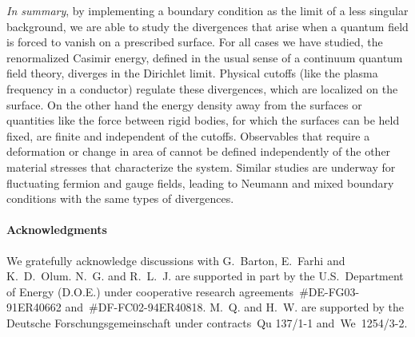 \documentclass[a4paper,aps,amsfonts,prl,showpacs,nobibnotes,nofootinbib,%
tightenlines,twocolumn]{revtex4}
\begin{document}
\emph{In summary}, by implementing a boundary condition as the limit
of a less singular background, we are able to study the divergences
that arise when a quantum field is forced to vanish on a prescribed
surface.  For all cases we have studied, the renormalized
Casimir energy, defined in the usual sense of a continuum quantum
field theory, diverges in the Dirichlet limit. Physical cutoffs (like
the plasma frequency in a conductor) regulate these divergences,  
which are localized on the surface.  On the other hand the
energy density away from the surfaces or quantities like the force
between rigid bodies, for which the surfaces can be held fixed, are
finite and independent of the cutoffs.  Observables that require a
deformation or change in area of \coordHE{} cannot be defined
independently of the other material stresses that characterize the
system.  Similar studies are underway for fluctuating fermion
and gauge fields, leading to Neumann and mixed boundary conditions
with the same types of divergences.  \bigskip

\paragraph{Acknowledgments}
We gratefully acknowledge discussions with G.~Barton, E.~Farhi and
K.~D.~Olum.  N.~G. and R.~L.~J. are supported in part by the
U.S.~Department of Energy (D.O.E.) under cooperative research
agreements~\#DE-FG03-91ER40662 and~\#DF-FC02-94ER40818.  M.~Q. and
H.~W. are supported by the Deutsche Forschungsgemeinschaft under
contracts~Qu 137/1-1 and~We~1254/3-2.
\end{document}
